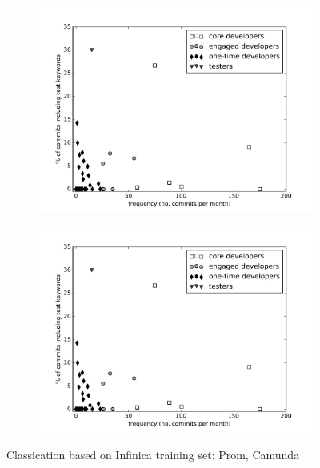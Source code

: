 \begin{figure}[h!t]
	\begin{subfigure}[t]{.5\linewidth}
		\centering
		\includegraphics[width=\textwidth]{ResourceClassification/figures/infinica4kpredict_prom_black.pdf}
	\end{subfigure}
	\begin{subfigure}[t]{.5\linewidth}
		\centering
		\includegraphics[width=\textwidth]{ResourceClassification/figures/infinica4kpredict_prom_black.pdf}
	\end{subfigure}
	\caption{Classication based on Infinica training set: Prom, Camunda}
	\label{fig:infinica-predict}
\end{figure}

